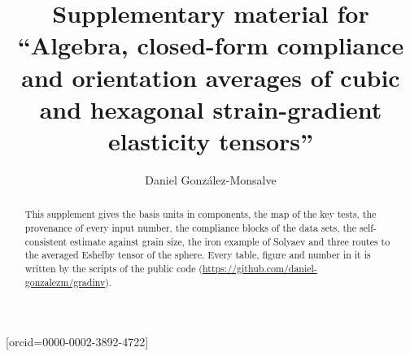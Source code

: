 \documentclass[a4paper,fleqn]{cas-sc}
\begin{document}
\let\WriteBookmarks\relax
\def\floatpagepagefraction{1}
\def\textpagefraction{.001}


\title[mode=title]{Supplementary material for ``Algebra, closed-form compliance and
orientation averages of cubic and hexagonal strain-gradient elasticity tensors''}

\author[1]{Daniel Gonz\'alez-Monsalve}[orcid=0000-0002-3892-4722]
\cormark[1]



\begin{abstract}
This supplement gives the basis units in components, the map of the key tests, the
provenance of every input number, the compliance blocks of the data sets, the
self-consistent estimate against grain size, the iron example of Solyaev and three
routes to the averaged Eshelby tensor of the sphere. Every table, figure and number in it
is written by the scripts of the public code (\url{https://github.com/daniel-gonzalezm/gradinv}).
\end{abstract}

\maketitle











\end{document}
